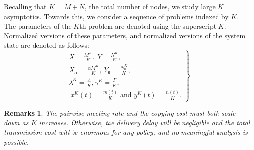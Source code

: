 \documentclass[10pt,journal,letterpaper]{IEEEtran}
\newtheorem{remarks}{Remarks}[section]
\newcommand{\remove}[1]{}
\begin{document}
Recalling that $K = M+N$, the total number of nodes, we study large $K$ asymptotics. Towards
this, we consider a sequence of problems indexed by $K$.
The parameters of the $K$th problem are denoted using the superscript $K$.
Normalized versions of these parameters, and normalized versions of the system state
are denoted as follows:
\begin{equation}
\label{eqn:scalings}
\left. \begin{aligned} X = \frac{M^K}{K},~Y = \frac{N^K}{K},\\
X_{\alpha} = \frac{\alpha M^K}{K},~Y_0 = \frac{N_0^K}{K}, \\
\lambda^K = \frac{\Lambda}{K}, \gamma^K = \frac{\Gamma}{K},\\
~x^K(t) = \frac{m(t)}{K} \mbox{ and }y^K(t) = \frac{n(t)}{K}.
\end{aligned} \right\}
\end{equation}
\remove{
\begin{equation}
\label{eqn:scalings}
\left. \begin{aligned} X = \frac{M(K)}{K},~Y = \frac{N(K)}{K},\\
X_{\alpha} = \frac{\alpha M(K)}{K},~Y_0 = \frac{N_0(K)}{K}, \\
\lambda(K) = \frac{\Lambda}{K}, \gamma(K) = \frac{\Gamma}{K},\\
~x^K(t) = \frac{m^K(t)}{K} \mbox{ and }y^K(t) = \frac{n^K(t)}{K}.
\end{aligned} \right\}
\end{equation}
}
\begin{remarks}
The pairwise meeting rate and the copying cost must both scale down as $K$ increases.
Otherwise, the delivery delay will be negligible and the total transmission cost will be
enormous for any policy, and no meaningful analysis is possible.
\end{remarks}
\end{document}
